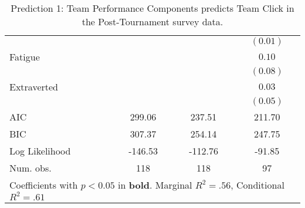 \begin{table}
\begin{center}
\begin{tabular}{l c c c }
                                                          &          &                       & $(0.01)$              \\
Fatigue                                                   &          &                       & $0.10$                \\
                                                          &          &                       & $(0.08)$              \\
Extraverted                                               &          &                       & $0.03$                \\
                                                          &          &                       & $(0.05)$              \\
\midrule
AIC                                                       & 299.06   & 237.51                & 211.70                \\
BIC                                                       & 307.37   & 254.14                & 247.75                \\
Log Likelihood                                            & -146.53  & -112.76               & -91.85                \\
Num. obs.                                                 & 118      & 118                   & 97                    \\
\bottomrule
\multicolumn{4}{l}{\scriptsize{Coefficients with $p < 0.05$ in \textbf{bold}. Marginal $R^2 = .56$, Conditional $R^2 = .61$}}
\end{tabular}
\caption{Prediction 1: Team Performance Components predicts Team Click in the Post-Tournament survey data.}
\label{tab:MLM1aJointActionSuccessClick}
\end{center}
\end{table}
